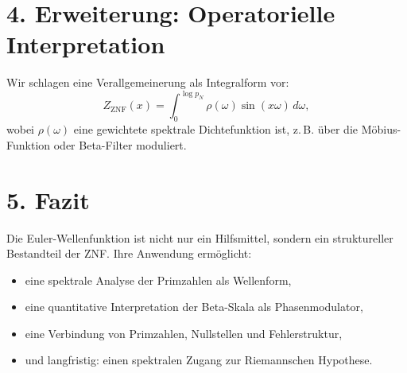 \documentclass[12pt]{article}
\begin{document}
\section*{4. Erweiterung: Operatorielle Interpretation}

Wir schlagen eine Verallgemeinerung als Integralform vor:
\[
Z_{\mathrm{ZNF}}(x) = \int_0^{\log p_N} \rho(\omega) \sin(x \omega) \, d\omega,
\]
wobei \(\rho(\omega)\) eine gewichtete spektrale Dichtefunktion ist, z.\,B. über die Möbius-Funktion oder Beta-Filter moduliert.

\section*{5. Fazit}

Die Euler-Wellenfunktion ist nicht nur ein Hilfsmittel, sondern ein struktureller Bestandteil der ZNF. Ihre Anwendung ermöglicht:
\begin{itemize}
  \item eine spektrale Analyse der Primzahlen als Wellenform,
  \item eine quantitative Interpretation der Beta-Skala als Phasenmodulator,
  \item eine Verbindung von Primzahlen, Nullstellen und Fehlerstruktur,
  \item und langfristig: einen spektralen Zugang zur Riemannschen Hypothese.
\end{itemize}

\vspace{1em}
\noindent{}
\end{document}
